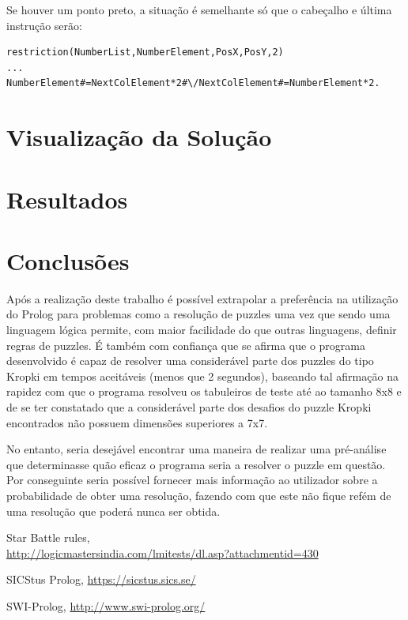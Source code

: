 \documentclass[runningheads,a4paper]{llncs}
\begin{document}
Se houver um ponto preto, a situação é semelhante só que o cabeçalho e última instrução serão:
\begin{verbatim}
restriction(NumberList,NumberElement,PosX,PosY,2)
...
NumberElement#=NextColElement*2#\/NextColElement#=NumberElement*2.
\end{verbatim}

\section{Visualização da Solução}

\section{Resultados}

\section{Conclusões}

Após a realização deste trabalho é possível extrapolar a preferência na utilização do Prolog para problemas como a resolução de puzzles uma vez que sendo uma linguagem lógica permite, com maior facilidade do que outras linguagens, definir regras de puzzles. É também com confiança que se afirma que o programa desenvolvido é capaz de resolver uma considerável parte dos puzzles do tipo Kropki em tempos aceitáveis (menos que 2 segundos), baseando tal afirmação na rapidez com que o programa resolveu os tabuleiros de teste até ao tamanho 8x8 e de se ter constatado que a considerável parte dos desafios do puzzle Kropki encontrados não possuem dimensões superiores a 7x7.

No entanto, seria desejável encontrar uma maneira de realizar uma pré-análise que determinasse quão eficaz o programa seria a resolver o puzzle em questão. Por conseguinte seria possível fornecer mais informação ao utilizador sobre a probabilidade de obter uma resolução, fazendo com que este não fique refém de uma resolução que poderá nunca ser obtida.

\begin{thebibliography}{4}

 Star Battle rules,\\
\url{http://logicmastersindia.com/lmitests/dl.asp?attachmentid=430}

 SICStus Prolog, \url{https://sicstus.sics.se/}

 SWI-Prolog, \url{http://www.swi-prolog.org/}

\end{thebibliography}
\end{document}
